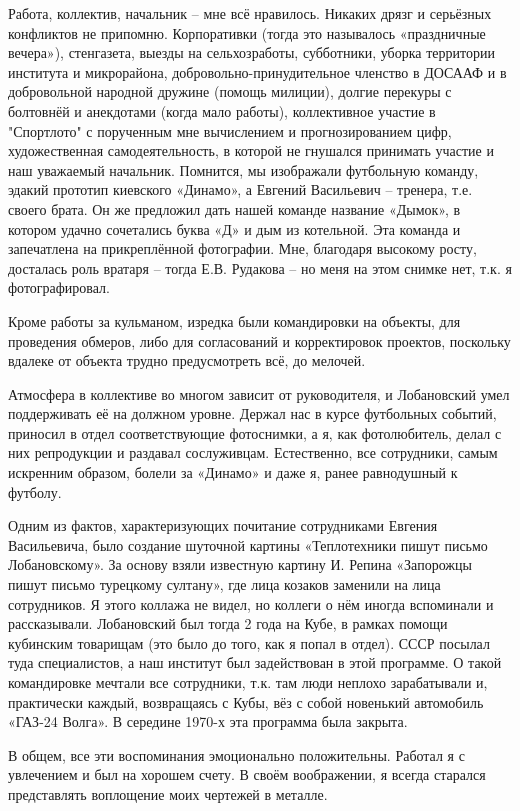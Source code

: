 Работа, коллектив, начальник – мне всё нравилось. Никаких дрязг и серьёзных
конфликтов не припомню. Корпоративки (тогда это называлось «праздничные
вечера»), стенгазета, выезды на сельхозработы, субботники, уборка территории
института и микрорайона, добровольно-принудительное членство в ДОСААФ и в
добровольной народной дружине (помощь милиции), долгие перекуры с болтовнёй и
анекдотами (когда мало работы), коллективное участие в "Спортлото" с порученным
мне вычислением и прогнозированием цифр, художественная самодеятельность, в
которой не гнушался принимать участие и наш уважаемый начальник. Помнится, мы
изображали футбольную команду, эдакий прототип киевского «Динамо», а Евгений
Васильевич – тренера, т.е. своего брата. Он же предложил дать нашей команде
название «Дымок», в котором удачно сочетались буква «Д» и дым из котельной. Эта
команда и запечатлена на прикреплённой фотографии. Мне, благодаря высокому
росту, досталась роль вратаря – тогда Е.В. Рудакова – но меня на этом снимке
нет, т.к. я фотографировал.

Кроме работы за кульманом, изредка были командировки на объекты, для проведения
обмеров, либо для согласований и корректировок проектов, поскольку вдалеке от
объекта трудно предусмотреть всё, до мелочей.

Атмосфера в коллективе во многом зависит от руководителя, и Лобановский умел
поддерживать её на должном уровне. Держал нас в курсе футбольных событий,
приносил в отдел соответствующие фотоснимки, а я, как фотолюбитель, делал с них
репродукции и раздавал сослуживцам. Естественно, все сотрудники, самым
искренним образом, болели за «Динамо» и даже я, ранее равнодушный к футболу.

Одним из фактов, характеризующих почитание сотрудниками Евгения Васильевича,
было создание шуточной картины «Теплотехники пишут письмо Лобановскому». За
основу взяли известную картину И. Репина «Запорожцы пишут письмо турецкому
султану», где лица козаков заменили на лица сотрудников. Я этого коллажа не
видел, но коллеги о нём иногда вспоминали и рассказывали. Лобановский был тогда
2 года на Кубе, в рамках помощи кубинским товарищам (это было до того, как я
попал в отдел). СССР посылал туда специалистов, а наш институт был задействован
в этой программе. О такой командировке мечтали все сотрудники, т.к. там люди
неплохо зарабатывали и, практически каждый, возвращаясь с Кубы, вёз с собой
новенький автомобиль «ГАЗ-24 Волга». В середине 1970-х эта программа была
закрыта.

В общем, все эти воспоминания эмоционально положительны. Работал я с увлечением
и был на хорошем счету. В своём воображении, я всегда старался представлять
воплощение моих чертежей в металле.

